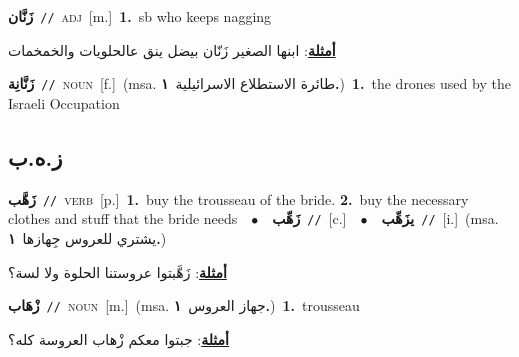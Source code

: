 \documentclass[10pt,a4paper,twoside]{article} %
\begin{document}
\begin{multicols}{2}
{\setlength\topsep{0pt}\textbf{\foreignlanguage{arabic}{زَنَّان}}\ {\color{gray}\texttt{//}\color{black}}\ \textsc{adj}\ [m.]\ \textbf{1.}~sb who keeps nagging\  \begin{flushright}\color{gray}\foreignlanguage{arabic}{\textbf{\underline{\foreignlanguage{arabic}{أمثلة}}}: ابنها الصغير زَنّان بيضل ينق عالحلويات والخمخمات}\end{flushright}\color{black}} \vspace{2mm}

{\setlength\topsep{0pt}\textbf{\foreignlanguage{arabic}{زَنَّانِة}}\ {\color{gray}\texttt{//}\color{black}}\ \textsc{noun}\ [f.]\ \color{gray}(msa. \foreignlanguage{arabic}{طائرة الاستطلاع الاسرائيلية}~\foreignlanguage{arabic}{\textbf{١.}})\color{black}\ \textbf{1.}~the drones used by the Israeli Occupation\ } \vspace{2mm}

\vspace{-3mm}
\subsection*{\color{blue}\foreignlanguage{arabic}{ز.ه.ب}\color{blue}{}} 

{\setlength\topsep{0pt}\textbf{\foreignlanguage{arabic}{زَهَّب}}\ {\color{gray}\texttt{//}\color{black}}\ \textsc{verb}\ [p.]\ \textbf{1.}~buy the trousseau of the bride.  \textbf{2.}~buy the necessary clothes and stuff that the bride needs\ \ $\bullet$\ \ \setlength\topsep{0pt}\textbf{\foreignlanguage{arabic}{زَهِّب}}\ {\color{gray}\texttt{//}\color{black}}\ [c.]\ \ $\bullet$\ \ \setlength\topsep{0pt}\textbf{\foreignlanguage{arabic}{يزَهِّب}}\ {\color{gray}\texttt{//}\color{black}}\ [i.]\ \color{gray}(msa. \foreignlanguage{arabic}{يشتري للعروس جِهازها}~\foreignlanguage{arabic}{\textbf{١.}})\color{black}\  \begin{flushright}\color{gray}\foreignlanguage{arabic}{\textbf{\underline{\foreignlanguage{arabic}{أمثلة}}}: زَهَّبتوا عروستنا الحلوة ولا لسة؟}\end{flushright}\color{black}} \vspace{2mm}

{\setlength\topsep{0pt}\textbf{\foreignlanguage{arabic}{زْهَاب}}\ {\color{gray}\texttt{//}\color{black}}\ \textsc{noun}\ [m.]\ \color{gray}(msa. \foreignlanguage{arabic}{جهاز العروس}~\foreignlanguage{arabic}{\textbf{١.}})\color{black}\ \textbf{1.}~trousseau\  \begin{flushright}\color{gray}\foreignlanguage{arabic}{\textbf{\underline{\foreignlanguage{arabic}{أمثلة}}}: جبتوا معكم زْهاب العروسة كله؟}\end{flushright}\color{black}} \vspace{2mm}


\end{multicols}
\end{document}
